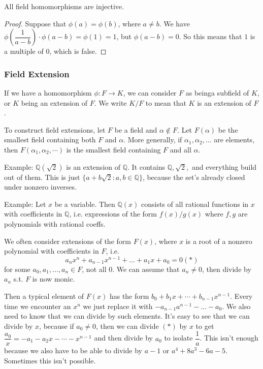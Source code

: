 \documentclass{scrartcl}
\begin{document}
\begin{proposition}
	All field homomorphisms are injective.
\end{proposition}

\begin{proof}
	Suppose that $\phi(a) = \phi(b)$, where $a \neq b$. We have $\phi(\dfrac{1}{a-b}) \cdot \phi(a-b) = \phi(1) = 1$, but $\phi(a-b) = 0$. So this means that $1$ is a multiple of $0$, which is false.
\end{proof}

\subsubsection{Field Extension}
If we have a homomorphism $\phi : F \rightarrow K$, we can consider $F$ as beinga subfield of $K$, or $K$ being an extension of $F$. We write $K/F$ to mean that $K$ is an extension of $F$.

To construct field extensions, let $F$ be a field and $\alpha \not\in F$. Let $F(\alpha)$ be the smallest field containing both $F$ and $\alpha$. More generally, if $\alpha_1, \alpha_2, \dotsc$ are elements, then $F(\alpha_1, \alpha_2, \cdots)$ is the smallest field containing $F$ and all $\alpha$.

Example: $\mathbb{Q}(\sqrt{2})$ is an extension of $\mathbb{Q}$. It contains $\mathbb{Q}, \sqrt{2},$ and everything build out of them. This is just $\{ a + b \sqrt{2} : a, b \in \mathbb{Q}\}$, because the set's already closed under nonzero inverses.

Example: Let $x$ be a variable. Then $\mathbb{Q}(x)$ consists of all rational functions in $x$ with coefficients in $\mathbb{Q}$, i.e. expressions of the form $f(x)/g(x)$ where $f, g$ are polynomials with rational coeffs.

We often consider extensions of the form $F(x)$, where $x$ is a root of a nonzero polynomial with coefficients in $F$, i.e.
$$a_nx^n + a_{n-1}x^{n-1} + \dotsc + a_1x + a_0 = 0 (*)$$
for some $a_0, a_1, \dotsc, a_n \in F$, not all 0. We can assume that $a_n \ne 0$, then divide by $a_n$ s.t. $F$ is now monic. 

Then a typical element of $F(x)$ has the form $b_0 + b_1x + \cdots + b_{n-1}x^{n-1}$. Every time we encounter an $x^n$ we just replace it with $-a_{n-1}a^{n-1} - \dotsc - a_0$. We also need to know that we can divide by such elements. It's easy to see that we can divide by $x$, because if $a_0 \ne 0$, then we can divide $(*)$ by $x$ to get $\dfrac{a_0}{x} = -a_1 -a_2x - \cdots - x^{n-1}$ and then divide by $a_0$ to isolate $\dfrac{1}{a}$. This isn't enough because we also have to be able to divide by $a-1$ or $a^4 + 8a^3 - 6a - 5$. Sometimes this isn't possible.
\end{document}
